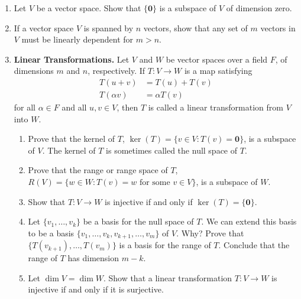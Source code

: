 {\begin{enumerate}
\item
Let $V$ be a vector space. Show that $\{ {\mathbf 0} \}$ is a subspace
of $V$ of dimension zero.


\item
If a vector space $V$ is spanned by $n$ vectors, show that any set of
$m$ vectors in $V$ must be linearly dependent for $m >n$.  


\item \label{vect:linear_transformation}
{\bf Linear Transformations.}
Let $V$ and $W$ be vector spaces over a field $F$, of dimensions $m$
and $n$, respectively. If $T: V \rightarrow W$ is a map satisfying
\begin{align*}
T( u+ v ) & =  T(u ) + T(v) \\
T( \alpha v ) & =  \alpha T(v)
\end{align*}
for all $\alpha \in F$ and all $u, v \in V$, then $T$ is called a
{\bfi linear transformation\/} from $V$ into $W$. 
\begin{enumerate}

   \item
Prove that the {\bfi kernel\/} of $T$, 
$\ker(T) = \{ v \in V : T(v) = 
{\mathbf 0} \}$, is a subspace of $V$. The kernel of $T$ is sometimes
called the {\bfi null space\/} of $T$. 

   \item
Prove that the {\bfi range\/} or
{\bfi range space\/} of $T$, $R(V) = \{ w \in W : T(v) = w \text{ for
some } v \in V \}$, is a subspace of $W$.

   \item
Show that $T : V \rightarrow W$ is injective if and only if 
$\ker(T) = \{ \mathbf 0 \}$.

   \item
Let $\{ v_1, \ldots, v_k \}$ be a basis for the null space of $T$. We
can extend this basis to be a basis $\{ v_1, \ldots, v_k, v_{k+1},
\ldots, v_m\}$ of $V$. Why?  Prove that $\{ T(v_{k+1}), \ldots, T(v_m)
\}$ is a basis for the range of $T$. Conclude that the range of $T$
has dimension $m-k$.

   \item
Let $\dim V = \dim W$.  Show that a linear transformation $T : V
\rightarrow W$ is injective if and only if it is surjective.


\end{enumerate}
\end{enumerate}}
